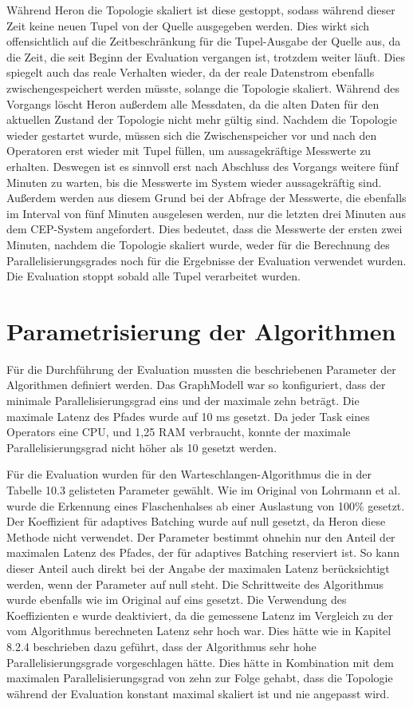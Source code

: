 Während Heron die Topologie skaliert ist diese gestoppt, sodass während dieser Zeit keine neuen Tupel von der Quelle ausgegeben werden.
Dies wirkt sich offensichtlich auf die Zeitbeschränkung für die Tupel-Ausgabe der Quelle aus, da die Zeit, die seit Beginn der Evaluation vergangen ist, trotzdem weiter läuft.
Dies spiegelt auch das reale Verhalten wieder, da der reale Datenstrom ebenfalls zwischengespeichert werden müsste, solange die Topologie skaliert.
Während des Vorgangs löscht Heron außerdem alle Messdaten, da die alten Daten für den aktuellen Zustand der Topologie nicht mehr gültig sind.
Nachdem die Topologie wieder gestartet wurde, müssen sich die Zwischenspeicher vor und nach den Operatoren erst wieder mit Tupel füllen, um aussagekräftige Messwerte zu erhalten.
Deswegen ist es sinnvoll erst nach Abschluss des Vorgangs weitere fünf Minuten zu warten, bis die Messwerte im System wieder aussagekräftig sind.
Außerdem werden aus diesem Grund bei der Abfrage der Messwerte, die ebenfalls im Interval von fünf Minuten ausgelesen werden, nur die letzten drei Minuten aus dem CEP-System angefordert.
Dies bedeutet, dass die Messwerte der ersten zwei Minuten, nachdem die Topologie skaliert wurde, weder für die Berechnung des Parallelisierungsgrades noch für die Ergebnisse der Evaluation verwendet wurden.
Die Evaluation stoppt sobald alle Tupel verarbeitet wurden.

\section{Parametrisierung der Algorithmen}

Für die Durchführung der Evaluation mussten die beschriebenen Parameter der Algorithmen definiert werden.
Das GraphModell war so konfiguriert, dass der minimale Parallelisierungsgrad eins und der maximale zehn beträgt.
Die maximale Latenz des Pfades wurde auf 10 ms gesetzt.
Da jeder Task eines Operators eine CPU, und 1,25 RAM verbraucht, konnte der maximale Parallelisierungsgrad nicht höher als 10 gesetzt werden.

Für die Evaluation wurden für den Warteschlangen-Algorithmus die in der Tabelle 10.3 gelisteten Parameter gewählt.
Wie im Original von Lohrmann et al. wurde die Erkennung eines Flaschenhalses ab einer Auslastung von 100\% gesetzt.
Der Koeffizient für adaptives Batching wurde auf null gesetzt, da Heron diese Methode nicht verwendet.
Der Parameter bestimmt ohnehin nur den Anteil der maximalen Latenz des Pfades, der für adaptives Batching reserviert ist.
So kann dieser Anteil auch direkt bei der Angabe der maximalen Latenz berücksichtigt werden, wenn der Parameter auf null steht.
Die Schrittweite des Algorithmus wurde ebenfalls wie im Original auf eins gesetzt.
Die Verwendung des Koeffizienten e wurde deaktiviert, da die gemessene Latenz im Vergleich zu der vom Algorithmus berechneten Latenz sehr hoch war.
Dies hätte wie in Kapitel 8.2.4 beschrieben dazu geführt, dass der Algorithmus sehr hohe Parallelisierungsgrade vorgeschlagen hätte.
Dies hätte in Kombination mit dem maximalen Parallelisierungsgrad von zehn zur Folge gehabt, dass die Topologie während der Evaluation konstant maximal skaliert ist und nie angepasst wird.

